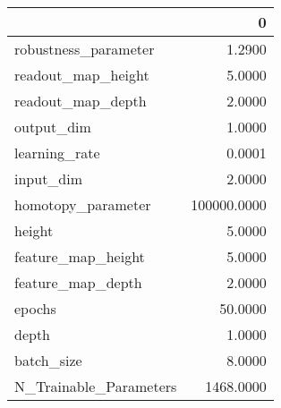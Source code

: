 \begin{tabular}{lr}
\toprule
{} &            0 \\
\midrule
robustness\_parameter   &       1.2900 \\
readout\_map\_height     &       5.0000 \\
readout\_map\_depth      &       2.0000 \\
output\_dim             &       1.0000 \\
learning\_rate          &       0.0001 \\
input\_dim              &       2.0000 \\
homotopy\_parameter     &  100000.0000 \\
height                 &       5.0000 \\
feature\_map\_height     &       5.0000 \\
feature\_map\_depth      &       2.0000 \\
epochs                 &      50.0000 \\
depth                  &       1.0000 \\
batch\_size             &       8.0000 \\
N\_Trainable\_Parameters &    1468.0000 \\
\bottomrule
\end{tabular}
